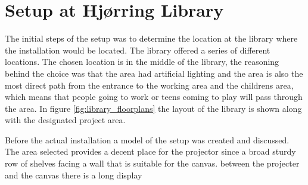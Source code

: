 \section{Setup at Hj{\o}rring Library}

The initial steps of the setup was to determine the location at the library where the installation would be located. The library offered a series of different locations. The chosen location is in the middle of the library, the reasoning behind the choice was that the area had artificial lighting and the area is also the most direct path from the entrance to the working area and the childrens area, which means that people going to work or teens coming to play will pass through the area. In figure \ref{fig:library_floorplans} the layout of the library is shown along with the designated project area.


Before the actual installation a model of the setup was created and discussed. The area selected provides a decent place for the projector since a broad sturdy row of shelves facing a wall that is suitable for the canvas. between the projecter and the canvas there is a long display 



